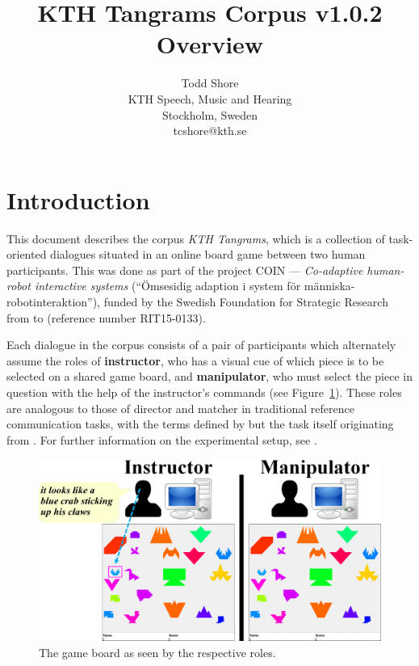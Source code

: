 \documentclass[USenglish]{article}
\newcommand{\term}[1]{{\bfseries #1}}	%
\newcommand{\corpusname}{KTH Tangrams}
\newcommand{\corpusversion}{\mbox{v1.0.2}}
\begin{document}
\title{\corpusname{} Corpus \corpusversion{} Overview}
\author{Todd Shore \\
KTH Speech, Music and Hearing \\
Stockholm, Sweden \\
{tcshore@kth.se}}	%
\date{}
\maketitle

\tableofcontents

\section{Introduction}

This document describes the corpus \emph{\corpusname{}}, which is a collection of task-oriented dialogues situated in an online board game between two human participants. This was done as part of the project COIN --- \emph{Co-adaptive human-robot interactive systems} (\enquote{\"Omsesidig adaption i system f\"or \linebreak m\"anniska-robotinteraktion}), funded by the Swedish Foundation for Strategic Research from  to  (reference number \mbox{RIT15-0133}).

Each dialogue in the corpus consists of a pair of participants which alternately assume the roles of \term{instructor}, who has a visual cue of which piece is to be selected on a shared game board, and \term{manipulator}, who must select the piece in question with the help of the instructor's commands (see Figure~\ref{fig:experiment_setup}). These roles are analogous to those of director and matcher in traditional reference communication tasks, with the terms defined by \textcite{Schober&Clark:1989} but the task itself originating from \textcite{Krauss&Weinheimer:1964}. For further information on the experimental setup, see .

\begin{figure}[h]
	\begin{center}
		\includegraphics[width=\linewidth]{experiment-setup}
		\caption{The game board as seen by the respective roles.}
		\label{fig:experiment_setup}
	\end{center}
\end{figure}
\end{document}
